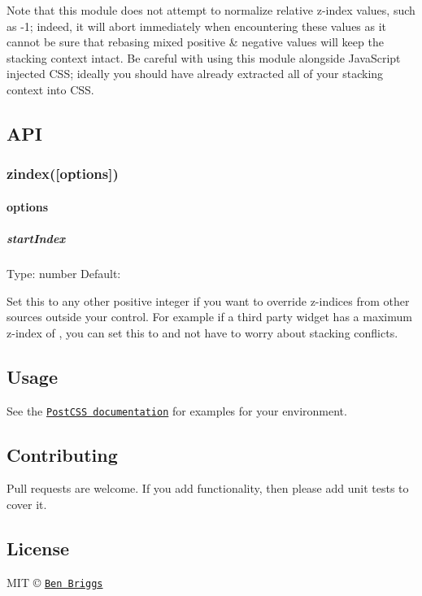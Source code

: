 Note that this module does not attempt to normalize relative z-\/index values, such as {\ttfamily -\/1}; indeed, it will abort immediately when encountering these values as it cannot be sure that rebasing mixed positive \& negative values will keep the stacking context intact. Be careful with using this module alongside Java\+Script injected C\+SS; ideally you should have already extracted all of your stacking context into C\+SS.

\subsection*{A\+PI}

\subsubsection*{zindex(\mbox{[}options\mbox{]})}

\paragraph*{options}

\subparagraph*{start\+Index}

Type\+: {\ttfamily number} Default\+: {}

Set this to any other positive integer if you want to override z-\/indices from other sources outside your control. For example if a third party widget has a maximum z-\/index of {}, you can set this to {} and not have to worry about stacking conflicts.

\subsection*{Usage}

See the \href{https://github.com/postcss/postcss#usage}{\tt Post\+C\+SS documentation} for examples for your environment.

\subsection*{Contributing}

Pull requests are welcome. If you add functionality, then please add unit tests to cover it.

\subsection*{License}

M\+IT © \href{http://beneb.info}{\tt Ben Briggs} 